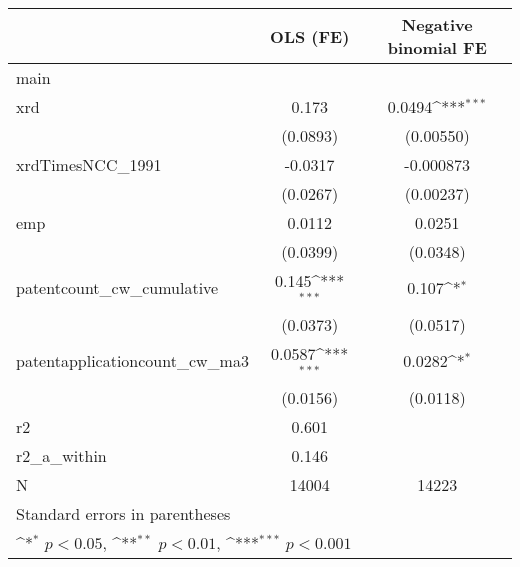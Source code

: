 {
\def\sym#1{\ifmmode^{#1}\else\(^{#1}\)\fi}
\begin{tabular}{l*{2}{c}}
\hline\hline
            &\multicolumn{1}{c}{OLS (FE)}&\multicolumn{1}{c}{Negative binomial FE}\\
\hline
main        &                     &                     \\
xrd         &       0.173         &      0.0494\sym{***}\\
            &    (0.0893)         &   (0.00550)         \\
[1em]
xrdTimesNCC\_1991&     -0.0317         &   -0.000873         \\
            &    (0.0267)         &   (0.00237)         \\
[1em]
emp         &      0.0112         &      0.0251         \\
            &    (0.0399)         &    (0.0348)         \\
[1em]
patentcount\_cw\_cumulative&       0.145\sym{***}&       0.107\sym{*}  \\
            &    (0.0373)         &    (0.0517)         \\
[1em]
patentapplicationcount\_cw\_ma3&      0.0587\sym{***}&      0.0282\sym{*}  \\
            &    (0.0156)         &    (0.0118)         \\
\hline
r2          &       0.601         &                     \\
r2\_a\_within &       0.146         &                     \\
N           &       14004         &       14223         \\
\hline\hline
\multicolumn{3}{l}{\footnotesize Standard errors in parentheses}\\
\multicolumn{3}{l}{\footnotesize \sym{*} \(p<0.05\), \sym{**} \(p<0.01\), \sym{***} \(p<0.001\)}\\
\end{tabular}
}
